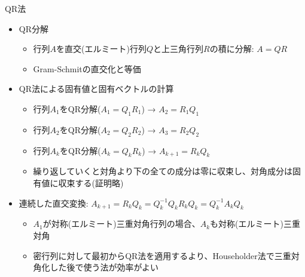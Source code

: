\begin{frame}[t,fragile]{QR法}
  \begin{itemize}
  \item QR分解
    \begin{itemize}
    \item 行列$A$を直交(エルミート)行列$Q$と上三角行列$R$の積に分解: $A=QR$
    \item Gram-Schmitの直交化と等価
    \end{itemize}
  \item QR法による固有値と固有ベクトルの計算
    \begin{itemize}
    \item 行列$A_1$をQR分解($A_1=Q_1R_1$) → $A_2 = R_1Q_1$ 
    \item 行列$A_2$をQR分解($A_2=Q_2R_2$) → $A_3 = R_2Q_2$ 
    \item 行列$A_k$をQR分解($A_k=Q_kR_k$) → $A_{k+1} = R_kQ_k$
    \item 繰り返していくと対角より下の全ての成分は零に収束し、対角成分は固有値に収束する(証明略)
    \end{itemize}
  \item 連続した直交変換: $A_{k+1} = R_kQ_k = Q_k^{-1}Q_kR_kQ_k = Q_k^{-1}A_kQ_k$
    \begin{itemize}
    \item $A_1$が対称(エルミート)三重対角行列の場合、$A_k$も対称(エルミート)三重対角
    \item 密行列に対して最初からQR法を適用するより、Householder法で三重対角化した後で使う法が効率がよい
    \end{itemize}
  \end{itemize}
\end{frame}
